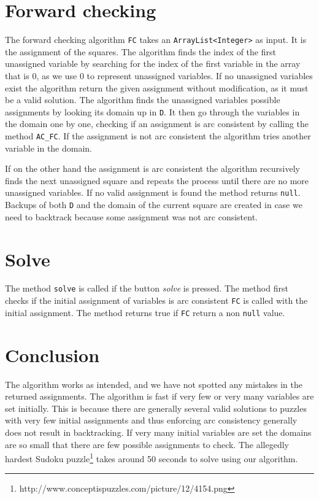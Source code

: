 \section{Forward checking}
The forward checking algorithm \texttt{FC} takes an \texttt{ArrayList<Integer>} as input. It is the assignment of the squares. The algorithm finds the index of the first unassigned variable by searching for the index of the first variable in the array that is $0$, as we use $0$ to represent unassigned variables. If no unassigned variables exist the algorithm return the given assignment without modification, as it must be a valid solution. The algorithm finds the unassigned variables possible assignments by looking its domain up in \texttt{D}. It then go through the variables in the domain one by one, checking if an assignment is arc consistent by calling the method \texttt{AC\_FC}. If the assignment is not arc consistent the algorithm tries another variable in the domain.

If on the other hand the assignment is arc consistent the algorithm recursively finds the next unassigned square and repeats the process until there are no more unassigned variables. If no valid assignment is found the method returns \texttt{null}. Backups of both \texttt{D} and the domain of the current square are created in case we need to backtrack because some assignment was not arc consistent.

\section{Solve}
The method \texttt{solve} is called if the button \textit{solve} is pressed. The method first checks if the initial assignment of variables is arc consistent \texttt{FC} is called with the initial assignment. The method returns true if \texttt{FC} return a non \texttt{null} value.

\section{Conclusion}
The algorithm works as intended, and we have not spotted any mistakes in the returned assignments. The algorithm is fast if very few or very many variables are set initially. This is because there are generally several valid solutions to puzzles with very few initial assignments and thus enforcing arc consistency generally does not result in backtracking. If very many initial variables are set the domains are so small that there are few possible assignments to check. The allegedly hardest Sudoku puzzle\footnote{http://www.conceptispuzzles.com/picture/12/4154.png} takes around 50 seconds to solve using our algorithm.
